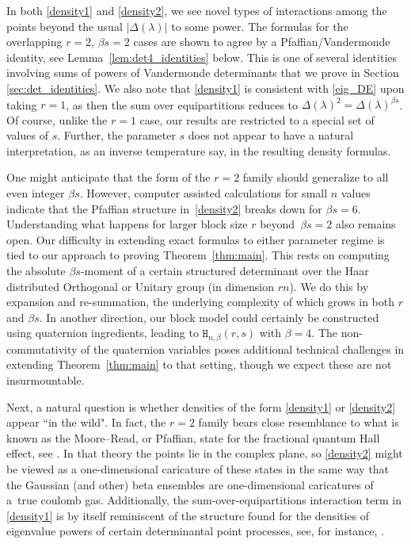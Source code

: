 \documentclass[pdftex]{sigma}
\numberwithin{equation}{section}
\theoremstyle{definition}
\newcommand{\HH}{\mathtt{H}_{n,\beta}}
\begin{document}
In both \eqref{density1} and \eqref{density2}, we see novel types of interactions among the points beyond the usual $|\Delta({\lambda})|$
to some power.
The formulas for the overlapping $r=2$, $\beta s = 2$ cases are shown to agree by a Pfaffian/Vandermonde identity, see Lemma~\ref{lem:det4_identities} below.
This is one of several identities involving sums of powers of Vandermonde determinants that we prove in Section \ref{sec:det_identities}.
We also note that \eqref{density1} is consistent with \eqref{eig_DE} upon taking $r=1$, as then the sum over equipartitions reduces to $\Delta(\lambda)^2 = \Delta(\lambda)^{\beta s}$. Of course, unlike the $r=1$ case, our results are restricted to a special set of values of $s$. Further, the parameter $s$ does not appear to have a natural interpretation, as an inverse temperature say, in the
resulting density formulas.




One might anticipate that the form of the $r=2$ family should generalize to all even integer $\beta s$. However, computer assisted calculations for small $n$ values indicate that the Pfaffian structure in~\eqref{density2} breaks down for $\beta s=6$. Understanding what happens for larger block size $r$ beyond~${\beta s=2}$ also remains open. Our difficulty in extending exact formulas to either parameter regime is
tied to our approach to proving Theorem~\ref{thm:main}. This rests on computing the absolute $\beta s$-moment of a certain structured determinant over the Haar distributed Orthogonal or Unitary group (in dimension $rn$). We do this by expansion and re-summation, the underlying complexity of which grows in both $r$ and $\beta s$. In another direction,
our block model could certainly be constructed using quaternion ingredients, leading to $\HH(r,s)$ with $\beta=4$.
The non-commutativity of the quaternion variables poses additional technical challenges in extending Theorem~\ref{thm:main} to that setting, though we expect these are not insurmountable.

Next, a natural question is whether densities of the form \eqref{density1} or \eqref{density2} appear ``in the wild". In fact,
the $r=2$ family bears close resemblance to what is known as the
Moore--Read, or Pfaffian, state for the fractional quantum Hall effect, see \cite{MR_1991}. In that theory the points lie in the complex plane,
so \eqref{density2} might be viewed as a one-dimensional caricature of these states in the same way that the Gaussian (and other) beta ensembles are one-dimensional caricatures of a~true coulomb gas. Additionally, the sum-over-equipartitions interaction term in \eqref{density1} is by itself reminiscent of the structure found for the densities of eigenvalue powers of certain determinantal point processes, see, for instance, \cite{Rains}.
\end{document}
